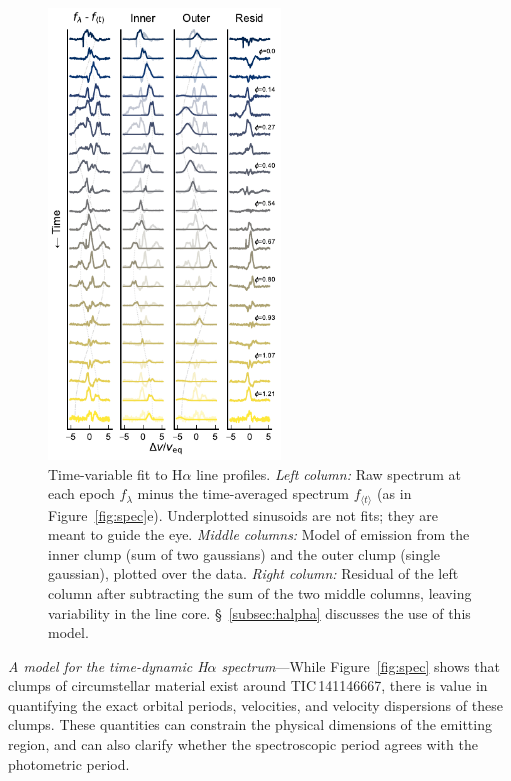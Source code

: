 \documentclass[11pt,twocolumn,tighten,linenumbers]{aastex7}
\begin{document}
\begin{figure}[!tp]
  \centering
  \includegraphics[width=0.55\textwidth]{figures/sf6.pdf}
  \caption{Time-variable fit to H$\alpha$ line profiles.  {\it Left
  column:} Raw spectrum at each epoch $f_{\lambda}$ minus the
  time-averaged spectrum $f_{\langle t \rangle}$ (as in
  Figure~\ref{fig:spec}e).  Underplotted sinusoids are not fits; they
  are meant to guide the eye.  {\it Middle columns:} Model of emission
  from the inner clump (sum of two gaussians) and the outer clump
  (single gaussian), plotted over the data.  {\it Right column:}
  Residual of the left column after subtracting the sum of the two
  middle columns, leaving variability in the line core.
  \S~\ref{subsec:halpha} discusses the use of this model.  }
  \label{fig:halphamodel}
\end{figure}

{\it A model for the time-dynamic H$\alpha$ spectrum}---While
Figure~\ref{fig:spec} shows that clumps of circumstellar material
exist around TIC\,141146667, there is value in quantifying the exact
orbital periods, velocities, and velocity dispersions of these clumps.
These quantities can constrain the physical dimensions of the emitting
region, and can also clarify whether the spectroscopic period agrees
with the photometric period.
\end{document}
